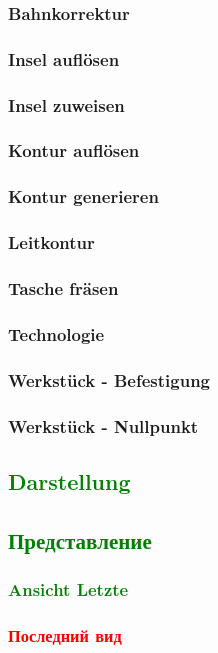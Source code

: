 \documentclass[14pt,a4paper]{book}
\newcommand{\DE}[1]{\textcolor{green}{#1}}
\newcommand{\RU}[1]{\textcolor{red}{#1}}
\begin{document}
			\subsubsection{Bahnkorrektur} 
			\subsubsection{Insel auflösen}
			\subsubsection{Insel zuweisen} 
			\subsubsection{Kontur auflösen}
			\subsubsection{Kontur generieren}
			\subsubsection{Leitkontur} 
			\subsubsection{Tasche fräsen} 
			\subsubsection{Technologie} 
			\subsubsection{Werkstück - Befestigung} 
			\subsubsection{Werkstück - Nullpunkt} 
		\DE{\subsection{Darstellung}}
		\DE{\subsection{Представление}}
			\DE{\subsubsection{Ansicht Letzte}} 
			\RU{\subsubsection{Последний вид}} 
\end{document}
